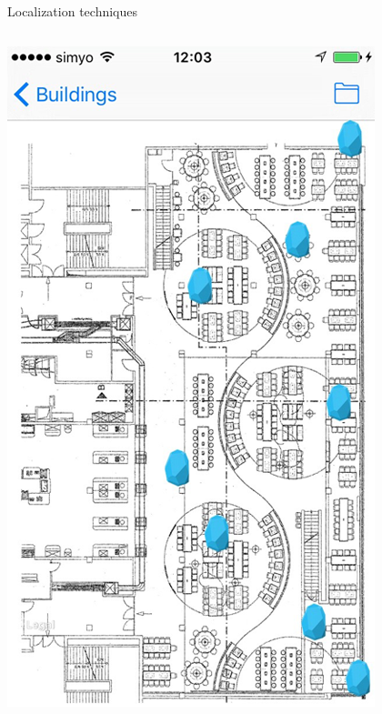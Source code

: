 \documentclass[11pt]{beamer}
\begin{document}
\begin{frame}[t]{Localization techniques}
\begin{columns}[t]
\begin{column}{0.3\textwidth}
      \includegraphics[width=\textwidth]{beaconsonthemapwithoutborder}%
    \end{column}
  \end{columns}

\end{frame}
\end{document}
